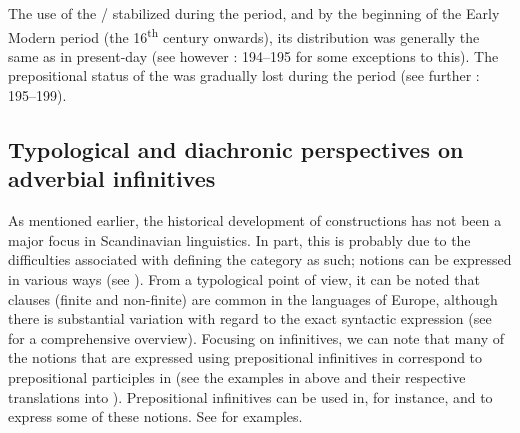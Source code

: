 \documentclass[output=paper]{langscibook}
\begin{document}
The use of the / stabilized during the  period, and by the beginning of the Early Modern period (the 16\textsuperscript{th} century onwards), its distribution was generally the same as in present-day  (see however \citealt{Hellquist1902}: 194–195 for some exceptions to this). The prepositional status of the  was gradually lost during the  period (see further \citealt{Kalm2016Satsekvivalenta}: 195–199). 


\subsection{Typological and diachronic perspectives on adverbial infinitives}\label{sec:kalm:3.2}

As mentioned earlier, the historical development of  constructions has not been a major focus in Scandinavian linguistics. In part, this is probably due to the difficulties associated with defining the  category as such;  notions can be expressed in various ways (see \citealt[3]{Van_der_auwera1998}). From a typological point of view, it can be noted that  clauses (finite and non-finite) are common in the languages of Europe, although there is substantial variation with regard to the exact syntactic expression (see \citealt{Hengenveld1998} for a comprehensive overview). Focusing on  infinitives, we can note that many of the  notions that are expressed using prepositional infinitives in  correspond to prepositional participles in  (see the examples in  above and their respective translations into ). Prepositional infinitives can be used in, for instance,  and  to express some of these notions. See  for examples. 
\end{document}
